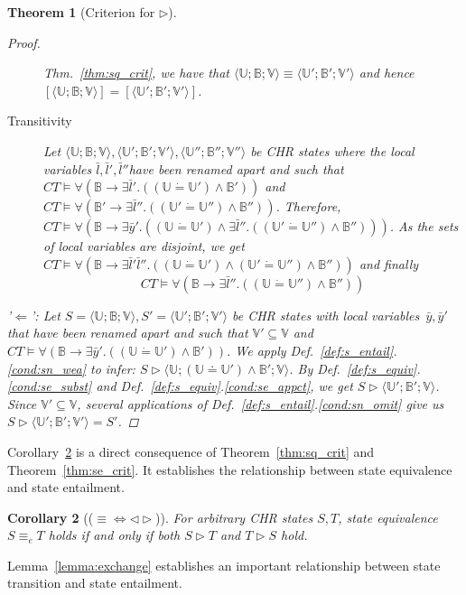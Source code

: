 \documentclass[acmtocl]{acmtrans2m}
\newtheorem{theorem}{Theorem}[section]
\newtheorem{corollary}[theorem]{Corollary}
\newcommand{\de}{\dot=}
\newcommand\state[1]{\langle #1 \rangle}
\newcommand\ent{\rhd}
\newcommand{\B}{\ensuremath{\mathbb{B}}}
\newcommand{\U}{\ensuremath{\mathbb{U}}}
\newcommand{\V}{\ensuremath{\mathbb{V}}}
\newcommand{\by}{\bar{y}}
\newcommand{\bl}{\bar{l}}
\begin{document}
\begin{theorem}[Criterion for $\ent$]
\begin{proof}
\begin{description}
Thm.~\ref{thm:sq_crit},
	we have that $\state{\U;\B;\V}\equiv \state{\U';\B';\V'}$ and hence
	$[\state{\U;\B;\V}]=[\state{\U';\B';\V'}]$.
	\item[Transitivity] Let
	$\state{\U;\B;\V},\state{\U';\B';\V'},\state{\U'';\B'';\V''}$ be CHR
states
	where the local variables $\bl,\bl',\bl''$have been renamed apart and
such
	that $CT\models \forall (\B\rightarrow\exists\bl'.((\U\de\U')\wedge\B'))$ and
	$CT\models \forall (\B'\rightarrow\exists\bl''.((\U'\de\U'')\wedge\B''))$.
	Therefore, $CT\models \forall (\B\rightarrow\exists\by'.((\U\de\U')
	\wedge\exists\bl''.((\U'\de\U'')\wedge\B'')))$. As the sets of local
variables
	are disjoint, we get $CT\models \forall
(\B\rightarrow\exists\bl'\bl''.((\U\de\U')
	\wedge(\U'\de\U'')\wedge\B''))$ and finally
	\[
		CT\models \forall (\B\rightarrow\exists\bl''.((\U\de\U'')\wedge\B''))
	\]
\end{description}

\noindent'$\Leftarrow$': Let $S = \state{\U;\B;\V}, S' = \state{\U';\B';\V'}$ be
CHR states with local variables~$\by,\by'$ that have been renamed apart and such
that $\V'\subseteq\V$ and
$
	CT\models \forall (\B \rightarrow \exists \by'.((\U \de \U') \wedge
	\B'))
$.
We apply Def.~\ref{def:s_entail}.\ref{cond:sn_wea} to infer:
$
	S\ent\state{\U;(\U\doteq \U')\wedge \B';\V}
$.
By Def.~\ref{def:s_equiv}.\ref{cond:se_subst} and
Def.~\ref{def:s_equiv}.\ref{cond:se_appct}, we get
$
	S\ent\state{\U';\B';\V}
$.
Since $\V'\subseteq\V$, several applications of
Def.~\ref{def:s_entail}.\ref{cond:sn_omit} give us
$
	S\ent\state{\U';\B';\V'}=S'
$.
\end{proof}
\end{theorem}

Corollary~\ref{crl:ent-equiv} is a direct consequence of Theorem~\ref{thm:sq_crit}
and Theorem~\ref{thm:se_crit}. It establishes the relationship between state
equivalence and state entailment.

\begin{corollary}[($\equiv\Leftrightarrow\triangleleft\ent$)]
\label{crl:ent-equiv}
  For arbitrary CHR states $S,T$, state equivalence $S\equiv_e T$ holds \emph{if
  and only if} both $S\ent T$ and $T\ent S$ hold.
\end{corollary}

Lemma~\ref{lemma:exchange} establishes an important relationship between state transition and state entailment.
\end{document}
